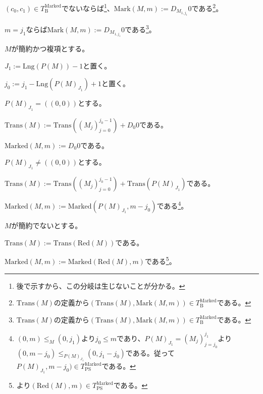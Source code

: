 \documentclass[dvipdfmx,uplatex]{jsarticle}
\theoremstyle{customnonumberbreakfortheorem}
\theoremstyle{customnonumberbreakforproof}
\begin{document}
\begin{nenumerate}
\begin{nenumerate}
\begin{nenumerate}
\begin{nenumerate}
\begin{nenumerate}
				\end{nenumerate}
				\item \((c_0,c_1) \in T_{\textrm{B}}^{\textrm{Marked}}\)でないならば\footnote{後で示すから、この分岐は生じないことが分かる。}、\(\textrm{Mark}(M,m) := D_{M_{1,j_1}} 0\)である\footnote{\(\textrm{Trans}(M)\)の定義から\((\textrm{Trans}(M),\textrm{Mark}(M,m)) \in T_{\textrm{B}}^{\textrm{Marked}}\)である。}。
			\end{nenumerate}
			\item \(m = j_1\)ならば\(\textrm{Mark}(M,m) := D_{M_{1,j_1}} 0\)である\footnote{\(\textrm{Trans}(M)\)の定義から\((\textrm{Trans}(M),\textrm{Mark}(M,m)) \in T_{\textrm{B}}^{\textrm{Marked}}\)である。}。
		\end{nenumerate}
	\end{nenumerate}
	\item \(M\)が簡約かつ複項とする。
	\begin{nenumerate}
		\item \(J_1 := \textrm{Lng}(P(M))-1\)と置く。
		\item \(j_0 := j_1 - \textrm{Lng}(P(M)_{J_1}) + 1\)と置く。
		\item \(P(M)_{J_1} = ((0,0))\)とする。
		\begin{nenumerate}
			\item \(\textrm{Trans}(M) := \textrm{Trans}((M_j)_{j=0}^{j_0-1}) + D_0 0\)である。
			\item \(\textrm{Marked}(M,m) := D_0 0\)である。
		\end{nenumerate}
		\item \(P(M)_{J_1} \neq ((0,0))\)とする。
		\begin{nenumerate}
			\item \(\textrm{Trans}(M) := \textrm{Trans}((M_j)_{j=0}^{j_0-1}) + \textrm{Trans}(P(M)_{J_1})\)である。
			\item \(\textrm{Marked}(M,m) := \textrm{Marked}(P(M)_{J_1},m-j_0)\)である\footnote{\((0,m) \leq_M (0,j_1)\)より\(j_0 \leq m\)であり、\(P(M)_{J_1} = (M_j)_{j=j_0}^{j_1}\)より\((0,m-j_0) \leq_{P(M)_{J_1}} (0,j_1-j_0)\)である。従って\(P(M)_{J_1},m-j_0) \in T_{\textrm{PS}}^{\textrm{Marked}}\)である。}。
		\end{nenumerate}
	\end{nenumerate}
	\item \(M\)が簡約でないとする。
	\begin{nenumerate}
		\item \(\textrm{Trans}(M) :=　\textrm{Trans}(\textrm{Red}(M))\)である。
		\item \(\textrm{Marked}(M,m) := \textrm{Marked}(\textrm{Red}(M),m)\)である\footnote{より\((\textrm{Red}(M),m) \in T_{\textrm{PS}}^{\textrm{Marked}}\)である。}。
	\end{nenumerate}
\end{nenumerate}
\end{document}
